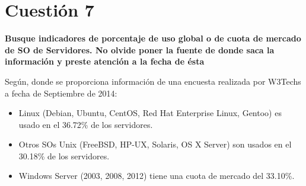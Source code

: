 \documentclass[a4paper,11pt]{article}
\newenvironment{answer}{%
\begin{list}{}{%
\addtolength{\hoffset}{0cm}
}%
\item[]}{\end{list}}
\begin{document}
 \section{Cuestión 7}
 \textbf{Busque indicadores de porcentaje de uso global o de cuota de mercado de SO de Servidores. No olvide poner 
 la fuente de donde saca la información y preste atención a la fecha de ésta}
 \begin{answer}
  
 Según, %
 donde se proporciona información de una encuesta realizada por W3Techs a fecha de Septiembre de 2014:
 \begin{itemize}
  \item Linux (Debian, Ubuntu, CentOS, Red Hat Enterprise Linux, Gentoo) es usado en el 36.72\% de los servidores.
  \item Otros SOs Unix (FreeBSD, HP-UX, Solaris, OS X Server) son usados en el 30.18\% de los servidores.
  \item Windows Server (2003, 2008, 2012) tiene una cuota de mercado del 33.10\%.
 \end{itemize}

 \end{answer}
\end{document}
